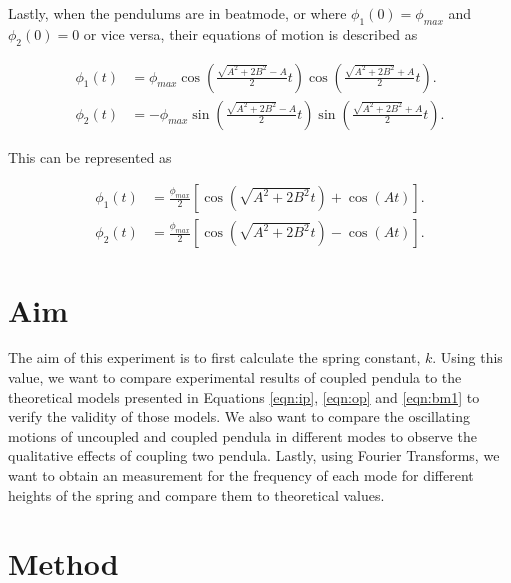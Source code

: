 \documentclass{article}
\begin{document}
Lastly, when the pendulums are in beatmode, or where $\phi_1(0)=\phi_{max}$
and $\phi_2(0)=0$ or vice versa, their equations of motion is described as

\begin{equation} \label{eqn:bm1}
    \begin{split}
    \phi_1(t) &= \phi_{max}\cos{\left(\frac{\sqrt{A^2+2B^2}-A}{2}t\right)}
    \cos{\left(\frac{\sqrt{A^2+2B^2}+A}{2}t\right)}. \\
    \phi_2(t) &= -\phi_{max}\sin{\left(\frac{\sqrt{A^2+2B^2}-A}{2}t\right)}
    \sin{\left(\frac{\sqrt{A^2+2B^2}+A}{2}t\right)}.
    \end{split}
\end{equation}

This can be represented as

\begin{equation} \label{eqn:bm2}
    \begin{split}
        \phi_1(t) &= \frac{\phi_{max}}{2}\left[\cos{\left(
        \sqrt{A^2+2B^2}t\right)}+\cos{\left(A t\right)}\right]. \\
        \phi_2(t) &= \frac{\phi_{max}}{2}\left[\cos{\left(
        \sqrt{A^2+2B^2}t\right)}-\cos{\left(A t\right)}\right]. 
    \end{split}
\end{equation}

\section{Aim}
The aim of this experiment is to first calculate the spring constant, $k$.
Using this value, we want to compare experimental results of coupled pendula
to the theoretical models presented in Equations \ref{eqn:ip}, \ref{eqn:op}
and \ref{eqn:bm1} to verify the validity of those models. We also want to 
compare the oscillating motions of uncoupled and coupled pendula in different 
modes to observe the qualitative effects of coupling two pendula. Lastly, using
Fourier Transforms, we want to obtain an measurement for the frequency of each
mode for different heights of the spring and compare them to theoretical values.

\section{Method}
\end{document}
